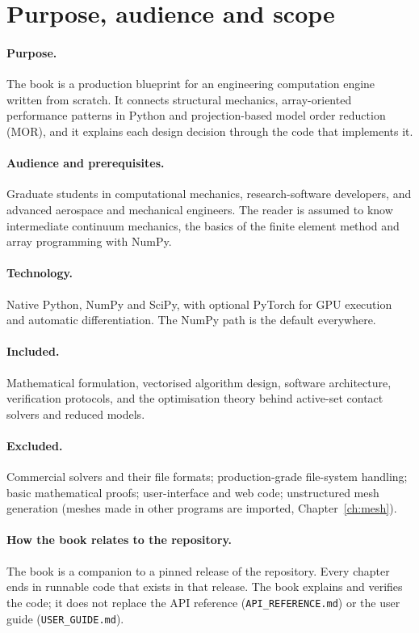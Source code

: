 \section{Purpose, audience and scope}\label{sec:scope}

\paragraph{Purpose.}
The book is a production blueprint for an engineering computation engine written from scratch. It connects structural mechanics, array-oriented performance patterns in Python and projection-based model order reduction (MOR), and it explains each design decision through the code that implements it.

\paragraph{Audience and prerequisites.}
Graduate students in computational mechanics, research-software developers, and advanced aerospace and mechanical engineers. The reader is assumed to know intermediate continuum mechanics, the basics of the finite element method and array programming with NumPy.

\paragraph{Technology.}
Native Python, NumPy and SciPy, with optional PyTorch for GPU execution and automatic differentiation. The NumPy path is the default everywhere.

\paragraph{Included.}
Mathematical formulation, vectorised algorithm design, software architecture, verification protocols, and the optimisation theory behind active-set contact solvers and reduced models.

\paragraph{Excluded.}
Commercial solvers and their file formats; production-grade file-system handling; basic mathematical proofs; user-interface and web code; unstructured mesh generation (meshes made in other programs are imported, Chapter~\ref{ch:mesh}).

\paragraph{How the book relates to the repository.}
The book is a companion to a pinned release of the repository. Every chapter ends in runnable code that exists in that release. The book explains and verifies the code; it does not replace the API reference (\texttt{API\_REFERENCE.md}) or the user guide (\texttt{USER\_GUIDE.md}).
